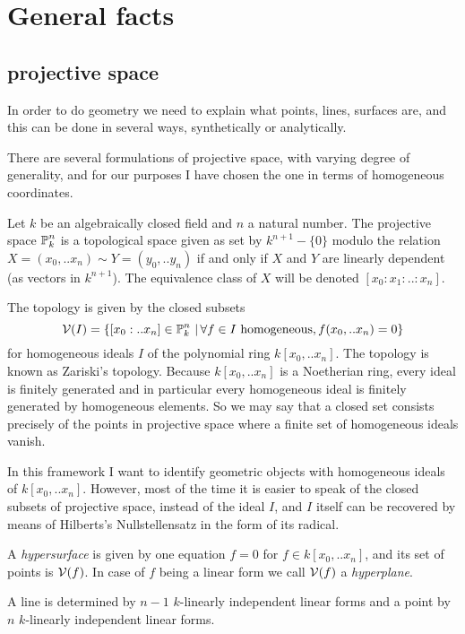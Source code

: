 \section{General facts}

\subsection{projective space}

In order to do geometry we need to explain what points, lines, surfaces are, and this can be done in several ways, synthetically or analytically.

There are several formulations of projective space, with varying degree of generality, and for our purposes I have chosen the one in terms of homogeneous coordinates.

Let $k$ be an algebraically closed field and $n$ a natural number.
The projective space $\operatorname{\mathbb P}^n_k$ is a topological space given as set by  $k^{n+1} - \{ 0 \}$ modulo the relation $X=(x_0,..x_n) \sim Y=(y_0,..y_n)$ if and only if $X$ and $Y$ are linearly dependent (as vectors in $k^{n+1}$). The equivalence class of $X$ will be denoted $[x_0:x_1:..:x_n]$.

The topology is given by the closed subsets
\begin{equation}
\operatorname{\mathcal V}(I) =
\left\lbrace [x_0:..x_n] \in \operatorname{\mathbb P}^n_k\,|\,  \forall f\in I \text{ homogeneous}, f(x_0,..x_n) = 0\right\rbrace
\end{equation}
for homogeneous ideals $I$ of the polynomial ring $k[x_0,..x_n]$.
The topology is known as Zariski's topology.
Because $k[x_0,..x_n]$ is a Noetherian ring, every ideal is finitely generated and in particular every homogeneous ideal is finitely generated by homogeneous elements.
So we may say that a closed set consists precisely of the points in projective space where a finite set of homogeneous ideals vanish.

In this framework I want to identify geometric objects with homogeneous ideals of $k[x_0,..x_n]$.
However, most of the time it is easier to speak of the closed subsets of projective space, instead of the ideal $I$, and $I$ itself can be recovered by means of Hilberts's Nullstellensatz in the form of its radical.

A \emph{hypersurface} is given by one equation $f=0$ for $f\in k[x_0,..x_n]$, and its set of points is $\operatorname{\mathcal V}(f)$.
In case of $f$ being a linear form we call $\operatorname{\mathcal V}(f)$ a \emph{hyperplane}.

A line is determined by $n-1$ $k$-linearly independent linear forms and a point by $n$ $k$-linearly independent linear forms.

